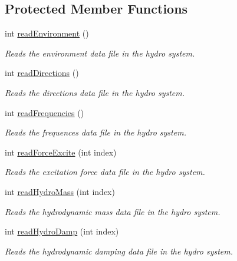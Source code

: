 \subsection*{Protected Member Functions}
\begin{DoxyCompactItemize}
\item 
int \hyperlink{classosea_1_1_hydro_reader_a5e90fd06958dfa68e7c14cbb1c18e80f}{read\-Environment} ()
\begin{DoxyCompactList}\small\item\em Reads the environment data file in the hydro system. \end{DoxyCompactList}\item 
int \hyperlink{classosea_1_1_hydro_reader_ad815ec7a5440f418f1b502f47bd3ea56}{read\-Directions} ()
\begin{DoxyCompactList}\small\item\em Reads the directions data file in the hydro system. \end{DoxyCompactList}\item 
int \hyperlink{classosea_1_1_hydro_reader_aac8c48a81488177fcecd0420f733cd0c}{read\-Frequencies} ()
\begin{DoxyCompactList}\small\item\em Reads the frequences data file in the hydro system. \end{DoxyCompactList}\item 
int \hyperlink{classosea_1_1_hydro_reader_a611dd7aafea404cf63da1735463fd308}{read\-Force\-Excite} (int index)
\begin{DoxyCompactList}\small\item\em Reads the excitation force data file in the hydro system. \end{DoxyCompactList}\item 
int \hyperlink{classosea_1_1_hydro_reader_aa7968e70e304d20d05df8e615e8518cb}{read\-Hydro\-Mass} (int index)
\begin{DoxyCompactList}\small\item\em Reads the hydrodynamic mass data file in the hydro system. \end{DoxyCompactList}\item 
int \hyperlink{classosea_1_1_hydro_reader_a5283219e60f95610a6619b6735c0d0cb}{read\-Hydro\-Damp} (int index)
\begin{DoxyCompactList}\small\item\em Reads the hydrodynamic damping data file in the hydro system. \end{DoxyCompactList}\item 

\end{DoxyCompactItemize}
